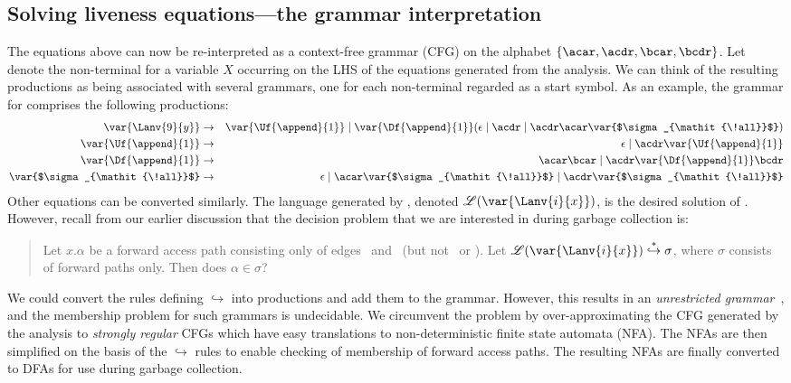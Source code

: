 \documentclass{llncs}
\begin{document}
\subsection{Solving liveness equations---the grammar interpretation}
The  equations above can now be re-interpreted as a
context-free grammar (CFG)  on the alphabet $\lbrace\acar, \acdr,
\bcar, \bcdr\rbrace$.  Let   denote the non-terminal for
a variable  $X$ occurring on  the LHS of the  equations generated
from the analysis.  We can  think of the resulting productions as
being associated with several  grammars, one for each non-terminal
 regarded as a start symbol.  As an example, the
grammar    for      comprises    the   following
productions:
 \begin{eqnarray*}
\var{\Lanv{9}{y}}  &\rightarrow&  \var{\Uf{\append}{1}} \mid  \var{\Df
  {\append}{1}}        (\epsilon         \mid        \acdr        \mid
 \acdr\acar\var{$\sigma_{\mathit{\!all}}$})\\
  \var{\Uf{\append}{1}}    &\rightarrow&    \epsilon   \mid
  \acdr\var{\Uf{\append}{1}}\\         
  \var{\Df{\append}{1}}
  &\rightarrow&               \acar\bcar               \mid
  \acdr\var{\Df{\append}{1}}\bcdr\\
\var{$\sigma_{\mathit{\!all}}$} &\rightarrow & \epsilon \mid \acar
\var{$\sigma_{\mathit{\!all}}$} \mid \acdr
\var{$\sigma_{\mathit{\!all}}$}
\end{eqnarray*}
Other equations can be converted  similarly.     The  language  generated  by  ,
denoted $\mathscr{L}(\var{\Lanv{i}{x}})
$,  is the desired  solution of
.   
However, recall from  our earlier  discussion that
the  decision problem that  we are  interested in  during garbage
collection is:
\begin{quote}
Let $x.\alpha$ be  a forward  access path  consisting  only  of   edges
\acar\  and \acdr\  (but  not \bcar\  or  \bcdr).   Let              $\mathscr{L}(\var{\Lanv{i}{x}})
\stackrel{*}{\hookrightarrow} \sigma$, where  $\sigma$  consists 
of forward paths only. Then does $\alpha \in \sigma$?
\end{quote}
We could convert  the  rules  defining  $\hookrightarrow$  into
productions and  add them to the grammar. However, this results
in  an {\em  unrestricted grammar}~\cite{hopcraft90toc},  and the
membership  problem   for  such  grammars   is  undecidable.   We
circumvent the problem by over-approximating the CFG generated by the analysis to  {\em
  strongly  regular}  CFGs which  have   easy
translations to non-deterministic finite state automata (NFA). The
NFAs are then simplified on the
basis  of  the  $\hookrightarrow$  rules to  enable  checking  of
membership of forward access paths. The resulting NFAs are   finally
converted to DFAs for use during garbage collection.
\end{document}
